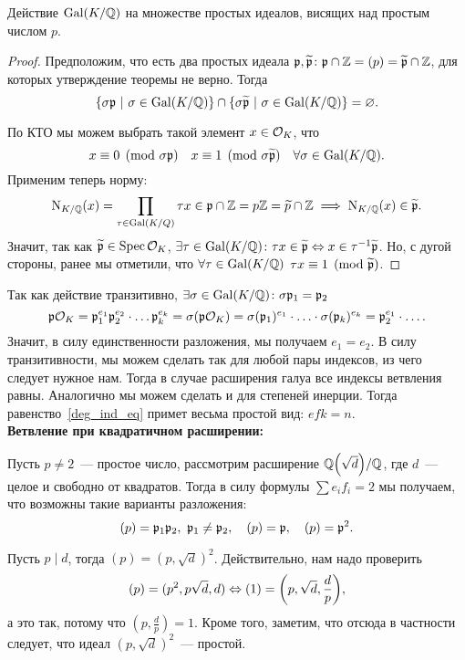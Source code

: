	\begin{theorem} 
		Действие $\operatorname{Gal}(K/\mathbb{Q})$ на множестве простых идеалов, висящих над простым числом $p$.
	\end{theorem}
	\begin{proof}
		Предположим, что есть два простых идеала $\mathfrak{p}, \widetilde{\mathfrak{p}}\colon \mathfrak{p} \cap \mathbb{Z} = (p) = \widetilde{\mathfrak{p}} \cap \mathbb{Z}$, для которых утверждение теоремы не верно.  Тогда 
		\[
			\{ \sigma \mathfrak{p} \ \vert \ \sigma \in \operatorname{Gal}(K/\mathbb{Q}) \} \cap \{ \sigma \widetilde{\mathfrak{p}} \ \vert \ \sigma \in \operatorname{Gal}(K / \mathbb{Q}) \} = \varnothing.
		\]

		По КТО мы можем выбрать такой элемент $x \in \mathcal{O}_{K}$, что 
		\[
			x \equiv 0 \pmod{\sigma \mathfrak{p}} \quad x \equiv 1 \pmod{\sigma \widetilde{\mathfrak{p}}} \quad \forall \sigma \in \operatorname{Gal}(K/\mathbb{Q}).			
		\]
		Применим теперь норму: 
		\[
			\operatorname{\mathrm{N}}_{K/\mathbb{Q}}(x) = \prod_{\tau \in \operatorname{Gal}(K/Q)}\tau x \in \mathfrak{p} \cap \mathbb{Z} = p\mathbb{Z} = \widetilde{p} \cap \mathbb{Z} \implies \operatorname{\mathrm{N}}_{K/\mathbb{Q}}(x) \in \widetilde{\mathfrak{p}}. 
		\]
		Значит, так как $\widetilde{\mathfrak{p}} \in \operatorname{Spec}{\mathcal{O}_{K}}$, $\exists \tau \in \operatorname{Gal}(K/\mathbb{Q})\colon \tau x \in \widetilde{\mathfrak{p}} \Leftrightarrow x \in \tau^{-1}\widetilde{\mathfrak{p}}$. Но, с дугой стороны, ранее мы отметили, что $\forall \tau \in \operatorname{Gal}(K/\mathbb{Q})$ $\tau x \equiv 1 \pmod{\widetilde{\mathfrak{p}}}$.
	\end{proof}


	Так как действие транзитивно, $\exists \sigma \in \operatorname{Gal}(K/\mathbb{Q}) \colon \sigma\mathfrak{p}_{1} = \mathfrak{p}_{2}$
	\[
		\mathfrak{p} \mathcal{O}_{K} = \mathfrak{p}_{1}^{e_1} \mathfrak{p}_{2}^{e_2} \cdot \ldots \mathfrak{p}_{k}^{e_k} = \sigma(\mathfrak{p} \mathcal{O}_{K}) = \sigma(\mathfrak{p}_{1})^{e_1} \cdot \ldots \cdot \sigma(\mathfrak{p}_{k})^{e_k} = \mathfrak{p}_{2}^{e_{1}} \cdot \ldots. 
	\]
	Значит, в силу единственности разложения, мы получаем $e_{1} = e_{2}$. В силу транзитивности, мы можем сделать так для любой пары индексов, из чего следует нужное нам. Тогда в случае расширения галуа все индексы ветвления равны. Аналогично мы можем сделать и для степеней инерции. Тогда равенство~\eqref{deg_ind_eq} примет весьма простой вид: $e f k = n$.\\


	\noindent\bf{Ветвление при квадратичном расширении:}

	Пусть $p \neq 2$~--- простое число, рассмотрим расширение $\Q\lr*{\sqrt{d}}/\Q$, где $d$~--- целое и свободно от квадратов. Тогда в силу формулы $\sum e_i f_i = 2$ мы получаем, что возможны такие варианты разложения:
	\[
		(p) = \mathfrak{p}_1 \mathfrak{p}_2, \ \mathfrak{p}_1 \neq \mathfrak{p}_2, \quad (p) = \mathfrak{p}, \quad (p) = \mathfrak{p}^2.
	\]

	Пусть $p \mid d$, тогда $(p) = (p, \sqrt{d})^2$. Действительно, нам надо проверить
	\[
		(p) = (p^2, p\sqrt{d}, d) \Leftrightarrow (1) = \lr*{p, \sqrt{d}, \frac{d}{p}},
	\]
	а это так, потому что $(p, \frac{d}{p}) = 1$. Кроме того, заметим, что отсюда в частности следует, что идеал $(p, \sqrt{d})^2$~--- простой. 

